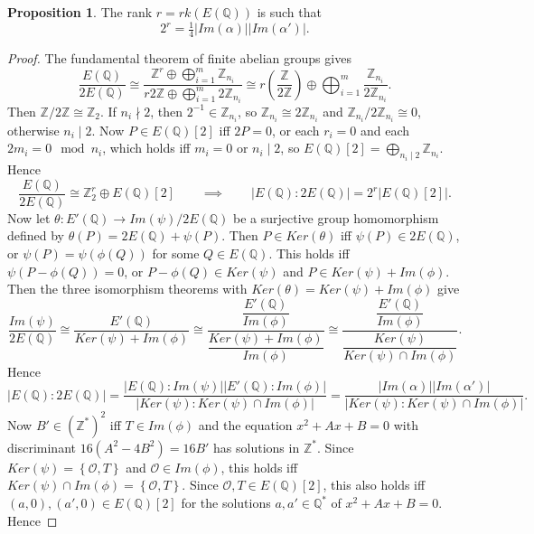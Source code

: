 \documentclass{article}
\newcommand{\Z}{\mathbb{Z}}
\newcommand{\Q}{\mathbb{Q}}
\newcommand{\rb}[1]{\left( #1 \right)}
\renewcommand{\sb}[1]{\left[ #1 \right]}
\newcommand{\cb}[1]{\left\{ #1 \right\}}
\newcommand{\abs}[1]{\left\lvert #1 \right\rvert}
\theoremstyle{definition}\newtheorem*{definition}{Definition}
\theoremstyle{definition}\newtheorem*{example}{Example}
\theoremstyle{definition}\newtheorem*{remark}{Remark}
\newtheorem{proposition}{Proposition}[subsection]
\begin{document}
\begin{proposition}
The rank $ r = rk\rb{E\rb{\Q}} $ is such that
$$ 2^r = \tfrac{1}{4}\abs{Im\rb{\alpha}}\abs{Im\rb{\alpha'}}. $$
\end{proposition}

\begin{proof}
The fundamental theorem of finite abelian groups gives
$$ \dfrac{E\rb{\Q}}{2E\rb{\Q}} \cong \dfrac{\Z^r \oplus \bigoplus_{i = 1}^m \Z_{n_i}}{r2\Z \oplus \bigoplus_{i = 1}^m 2\Z_{n_i}} \cong r\rb{\dfrac{\Z}{2\Z}} \oplus \bigoplus_{i = 1}^m \dfrac{\Z_{n_i}}{2\Z_{n_i}}. $$
Then $ \Z / 2\Z \cong \Z_2 $. If $ n_i \nmid 2 $, then $ 2^{-1} \in \Z_{n_i} $, so $ \Z_{n_i} \cong 2\Z_{n_i} $ and $ \Z_{n_i} / 2\Z_{n_i} \cong 0 $, otherwise $ n_i \mid 2 $. Now $ P \in E\rb{\Q}\sb{2} $ iff $ 2P = 0 $, or each $ r_i = 0 $ and each $ 2m_i = 0 \mod n_i $, which holds iff $ m_i = 0 $ or $ n_i \mid 2 $, so $ E\rb{\Q}\sb{2} = \bigoplus_{n_i \mid 2} \Z_{n_i} $. Hence
$$ \dfrac{E\rb{\Q}}{2E\rb{\Q}} \cong \Z^r_2 \oplus E\rb{\Q}\sb{2} \qquad \implies \qquad \abs{E\rb{\Q} : 2E\rb{\Q}} = 2^r\abs{E\rb{\Q}\sb{2}}. $$
Now let $ \theta : E'\rb{\Q} \to Im\rb{\psi} / 2E\rb{\Q} $ be a surjective group homomorphism defined by $ \theta\rb{P} = 2E\rb{\Q} + \psi\rb{P} $. Then $ P \in Ker\rb{\theta} $ iff $ \psi\rb{P} \in 2E\rb{\Q} $, or $ \psi\rb{P} = \psi\rb{\phi\rb{Q}} $ for some $ Q \in E\rb{\Q} $. This holds iff $ \psi\rb{P - \phi\rb{Q}} = 0 $, or $ P - \phi\rb{Q} \in Ker\rb{\psi} $ and $ P \in Ker\rb{\psi} + Im\rb{\phi} $. Then the three isomorphism theorems with $ Ker\rb{\theta} = Ker\rb{\psi} + Im\rb{\phi} $ give
$$ \dfrac{Im\rb{\psi}}{2E\rb{\Q}} \cong \dfrac{E'\rb{\Q}}{Ker\rb{\psi} + Im\rb{\phi}} \cong \dfrac{\dfrac{E'\rb{\Q}}{Im\rb{\phi}}}{\dfrac{Ker\rb{\psi} + Im\rb{\phi}}{Im\rb{\phi}}} \cong \dfrac{\dfrac{E'\rb{\Q}}{Im\rb{\phi}}}{\dfrac{Ker\rb{\psi}}{Ker\rb{\psi} \cap Im\rb{\phi}}}. $$
Hence
$$ \abs{E\rb{\Q} : 2E\rb{\Q}} = \dfrac{\abs{E\rb{\Q} : Im\rb{\psi}}\abs{E'\rb{\Q} : Im\rb{\phi}}}{\abs{Ker\rb{\psi} : Ker\rb{\psi} \cap Im\rb{\phi}}} = \dfrac{\abs{Im\rb{\alpha}}\abs{Im\rb{\alpha'}}}{\abs{Ker\rb{\psi} : Ker\rb{\psi} \cap Im\rb{\phi}}}. $$
Now $ B' \in \rb{\Z^*}^2 $ iff $ T \in Im\rb{\phi} $ and the equation $ x^2 + Ax + B = 0 $ with discriminant $ 16\rb{A^2 - 4B^2} = 16B' $ has solutions in $ \Z^* $. Since $ Ker\rb{\psi} = \cb{\mathcal{O}, T} $ and $ \mathcal{O} \in Im\rb{\phi} $, this holds iff $ Ker\rb{\psi} \cap Im\rb{\phi} = \cb{\mathcal{O}, T} $. Since $ \mathcal{O}, T \in E\rb{\Q}\sb{2} $, this also holds iff $ \rb{a, 0}, \rb{a', 0} \in E\rb{\Q}\sb{2} $ for the solutions $ a, a' \in \Q^* $ of $ x^2 + Ax + B = 0 $. Hence

\end{proof}
\end{document}
